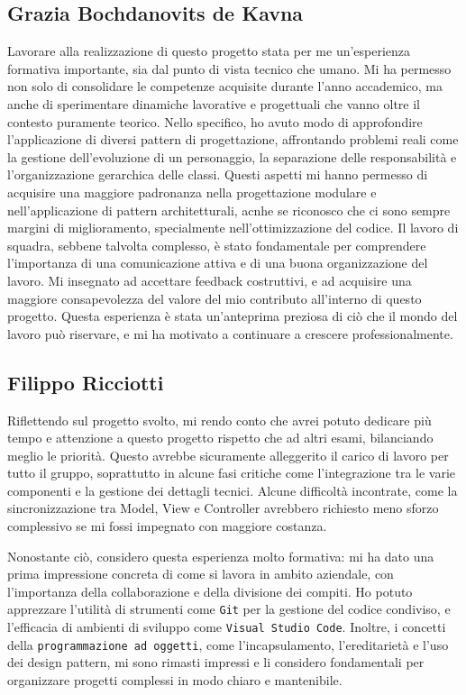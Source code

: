 \documentclass[a4paper,12pt]{report}
\begin{document}
\subsection{Grazia Bochdanovits de Kavna}
Lavorare alla realizzazione di questo progetto stata per me un'esperienza formativa importante, sia dal punto di vista tecnico che umano.
Mi ha permesso non solo di consolidare le competenze acquisite durante l'anno accademico, ma anche di sperimentare dinamiche lavorative e progettuali che vanno oltre il contesto puramente teorico.
Nello specifico, ho avuto modo di approfondire l'applicazione di diversi pattern di progettazione, affrontando problemi reali come la gestione dell'evoluzione di un personaggio, la separazione delle
responsabilità e l'organizzazione gerarchica delle classi. Questi aspetti mi hanno permesso di acquisire una maggiore padronanza nella progettazione modulare e nell'applicazione di pattern architetturali, acnhe se riconosco che ci sono
sempre margini di miglioramento, specialmente nell'ottimizzazione del codice.
Il lavoro di squadra, sebbene talvolta complesso, è stato fondamentale per comprendere l'importanza di una comunicazione attiva e di una buona organizzazione del lavoro.
Mi insegnato ad accettare feedback costruttivi, e ad acquisire una maggiore consapevolezza del valore del mio contributo all'interno di questo progetto.
Questa esperienza è stata un'anteprima preziosa di ciò che il mondo del lavoro può riservare, e mi ha motivato a continuare a crescere professionalmente.

\subsection{Filippo Ricciotti}
Riflettendo sul progetto svolto, mi rendo conto che avrei potuto dedicare più tempo e attenzione a questo progetto rispetto che ad altri esami, bilanciando meglio le priorità. Questo avrebbe sicuramente alleggerito il carico di lavoro per tutto il gruppo, soprattutto in alcune fasi critiche come l’integrazione tra le varie componenti e la gestione dei dettagli tecnici. Alcune difficoltà incontrate, come la sincronizzazione tra Model, View e Controller avrebbero richiesto meno sforzo complessivo se mi fossi impegnato con maggiore costanza.

Nonostante ciò, considero questa esperienza molto formativa: mi ha dato una prima impressione concreta di come si lavora in ambito aziendale, con l'importanza della collaborazione e della divisione dei compiti. Ho potuto apprezzare l'utilità di strumenti come \texttt{Git} per la gestione del codice condiviso, e l'efficacia di ambienti di sviluppo come \texttt{Visual Studio Code}. Inoltre, i concetti della \texttt{programmazione ad oggetti}, come l'incapsulamento, l'ereditarietà e l'uso dei design pattern, mi sono rimasti impressi e li considero fondamentali per organizzare progetti complessi in modo chiaro e mantenibile.
\end{document}
